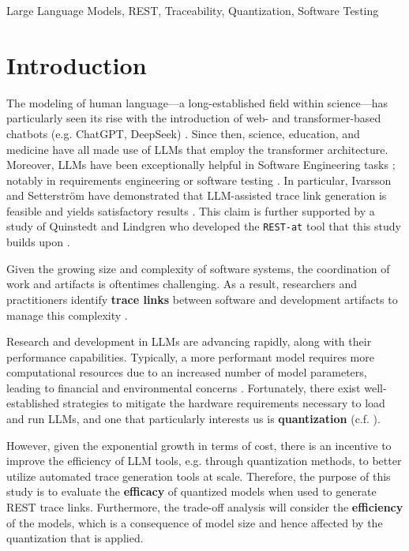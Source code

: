 \documentclass[conference]{IEEEtran}
\begin{document}
\begin{IEEEkeywords}
Large Language Models, REST, Traceability, Quantization, Software Testing
\end{IEEEkeywords}

\section{Introduction}\label{sec:intro}

The modeling of human language---a long-established field within science---has particularly seen its rise with the introduction of web- and transformer-based chatbots (e.g. ChatGPT, DeepSeek) \cite{jones1994Natural,vaswani2017Attention,naveed2024Comprehensive}. Since then, science, education, and medicine have all made use of LLMs that employ the transformer architecture. Moreover, LLMs have been exceptionally helpful in Software Engineering tasks \cite{naveed2024Comprehensive}; notably in requirements engineering \cite{arora2024Advancing} or software testing \cite{dakhel2024Effective, wang2024Software}. In particular, Ivarsson and Setterström have demonstrated that LLM-assisted trace link generation is feasible and yields satisfactory results \cite{ivarsson2023automated}. This claim is further supported by a study of Quinstedt and Lindgren who developed the \verb|REST-at| tool that this study builds upon \cite{quinstedt2024Optimizing}. 

Given the growing size and complexity of software systems, the coordination of work and artifacts is oftentimes challenging. As a result, researchers and practitioners identify \textbf{trace links} between software and development artifacts to manage this complexity \cite{jaber2013Effect}.

Research and development in LLMs are advancing rapidly, along with their performance capabilities. Typically, a more performant model requires more computational resources due to an increased number of model parameters, leading to financial and environmental concerns \cite{naveed2024Comprehensive}. Fortunately, there exist well-established strategies to mitigate the hardware requirements necessary to load and run LLMs, and one that particularly interests us is \textbf{quantization} (c.f. \cite{shen2024exploring, frantar2023GPTQ, lin2024AWQ, chen2024EfficientQAT}). 

However, given the exponential growth in terms of cost, there is an incentive to improve the efficiency of LLM tools, e.g. through quantization methods, to better utilize automated trace generation tools at scale. Therefore, the purpose of this study is to evaluate the \textbf{efficacy} of quantized models when used to generate REST trace links. Furthermore, the trade-off analysis will consider the \textbf{efficiency} of the models, which is a consequence of model size and hence affected by the quantization that is applied.
\end{document}
